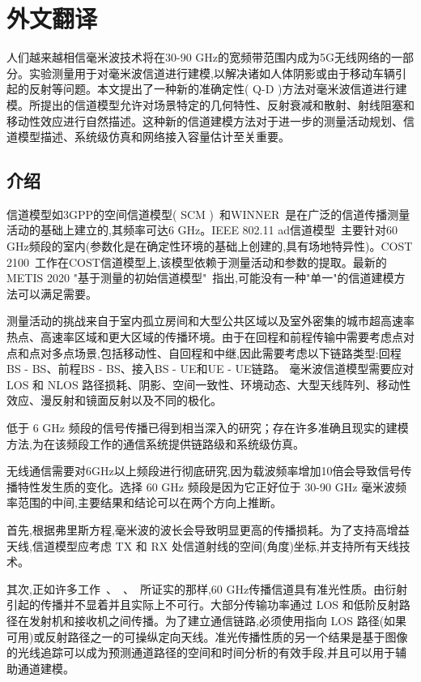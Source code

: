 \cleardoublepage

\newrefsection

\chapter{外文翻译}

人们越来越相信毫米波技术将在30-90 GHz的宽频带范围内成为5G无线网络的一部分。实验测量用于对毫米波信道进行建模,以解决诸如人体阴影或由于移动车辆引起的反射等问题。本文提出了一种新的准确定性( Q-D )方法对毫米波信道进行建模。所提出的信道模型允许对场景特定的几何特性、反射衰减和散射、射线阻塞和移动性效应进行自然描述。这种新的信道建模方法对于进一步的测量活动规划、信道模型描述、系统级仿真和网络接入容量估计至关重要。
\section{介绍}
信道模型如3GPP的空间信道模型( SCM )~\cite{3gpptr}和WINNER~\cite{winnerii}是在广泛的信道传播测量活动的基础上建立的,其频率可达6 GHz。IEEE 802.11 ad信道模型~\cite{ieee80211ad}主要针对60 GHz频段的室内(参数化是在确定性环境的基础上创建的,具有场地特异性)。COST 2100~\cite{cost2100}工作在COST信道模型上,该模型依赖于测量活动和参数的提取。最新的METIS 2020 "基于测量的初始信道模型"~\cite{metis2020}指出,可能没有一种"单一"的信道建模方法可以满足需要。

测量活动的挑战来自于室内孤立房间和大型公共区域以及室外密集的城市超高速率热点、高速率区域和更大区域的传播环境。由于在回程和前程传输中需要考虑点对点和点对多点场景,包括移动性、自回程和中继,因此需要考虑以下链路类型:回程BS - BS、前程BS - BS、接入BS - UE和UE - UE链路。
毫米波信道模型需要应对 LOS 和 NLOS 路径损耗、阴影、空间一致性、环境动态、大型天线阵列、移动性效应、漫反射和镜面反射以及不同的极化。

低于 6 GHz 频段的信号传播已得到相当深入的研究；存在许多准确且现实的建模方法,为在该频段工作的通信系统提供链路级和系统级仿真。

无线通信需要对6GHz以上频段进行彻底研究,因为载波频率增加10倍会导致信号传播特性发生质的变化。选择 60 GHz 频段是因为它正好位于 30-90 GHz 毫米波频率范围的中间,主要结果和结论可以在两个方向上推断。

首先,根据弗里斯方程,毫米波的波长会导致明显更高的传播损耗。为了支持高增益天线,信道模型应考虑 TX 和 RX 处信道射线的空间(角度)坐标,并支持所有天线技术。

其次,正如许多工作~\cite{ieee80211ad}、~\cite{rappaport2013a}、~\cite{rappaport2013b}所证实的那样,60 GHz传播信道具有准光性质。由衍射引起的传播并不显着并且实际上不可行。大部分传输功率通过 LOS 和低阶反射路径在发射机和接收机之间传播。为了建立通信链路,必须使用指向 LOS 路径(如果可用)或反射路径之一的可操纵定向天线。准光传播性质的另一个结果是基于图像的光线追踪可以成为预测通道路径的空间和时间分析的有效手段,并且可以用于辅助通道建模。

